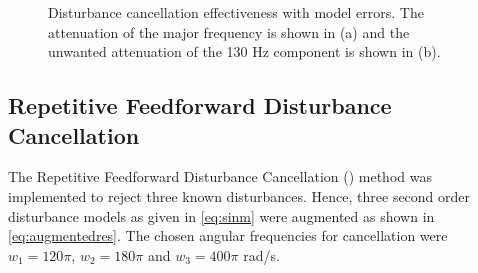 \begin{figure}[h!]
  \centering %
  \qquad
  \caption{\label{fig:imp_model_error}  Disturbance cancellation effectiveness with model errors. The attenuation of the major frequency is shown in (a) and the unwanted attenuation of the 130 Hz component is shown in (b).}
\end{figure}

\newpage
\FloatBarrier
\subsection{Repetitive Feedforward Disturbance Cancellation}
The Repetitive Feedforward Disturbance Cancellation (\abbrRFDC) method was implemented to reject three known disturbances. Hence, three second order disturbance models as given in \eqref{eq:sinm} were augmented as shown in \eqref{eq:augmentedres}. The chosen angular frequencies for cancellation were $w_1 = 120\pi$, $w_2 = 180\pi$ and $w_3 = 400\pi$ rad/s.

